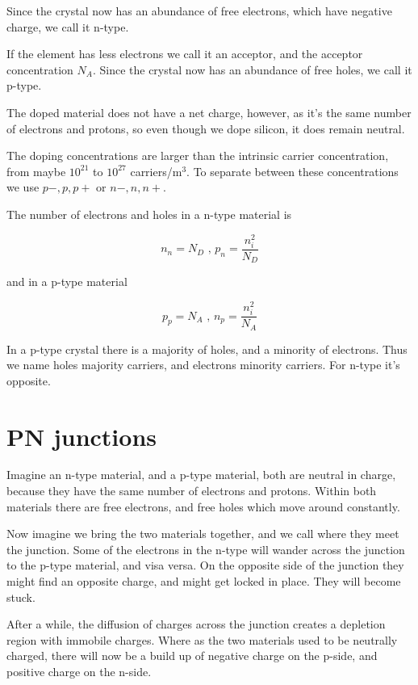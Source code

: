 Since the crystal now has an abundance of free electrons, which have
negative charge, we call it n-type.

If the element has less electrons we call it an acceptor, and the
acceptor concentration \(N_{A}\). Since the crystal now has an abundance
of free holes, we call it p-type.

The doped material does not have a net charge, however, as it's the same
number of electrons and protons, so even though we dope silicon, it does
remain neutral.

The doping concentrations are larger than the intrinsic carrier
concentration, from maybe \(10^{21}\) to \(10^{27}\) carriers/m\(^{3}\).
To separate between these concentrations we use \(p-,p,p+\) or
\(n-, n, n+\).

The number of electrons and holes in a n-type material is

\[ n_n = N_D \text{ ,  } p_n = \frac{n_i^2}{N_D} \]

and in a p-type material

\[ p_p = N_A \text{ , } n_p = \frac{n_i^2}{N_A} \]

In a p-type crystal there is a majority of holes, and a minority of
electrons. Thus we name holes majority carriers, and electrons minority
carriers. For n-type it's opposite.

\section{PN junctions}\label{pn-junctions}

Imagine an n-type material, and a p-type material, both are neutral in
charge, because they have the same number of electrons and protons.
Within both materials there are free electrons, and free holes which
move around constantly.

Now imagine we bring the two materials together, and we call where they
meet the junction. Some of the electrons in the n-type will wander
across the junction to the p-type material, and visa versa. On the
opposite side of the junction they might find an opposite charge, and
might get locked in place. They will become stuck.

After a while, the diffusion of charges across the junction creates a
depletion region with immobile charges. Where as the two materials used
to be neutrally charged, there will now be a build up of negative charge
on the p-side, and positive charge on the n-side.

